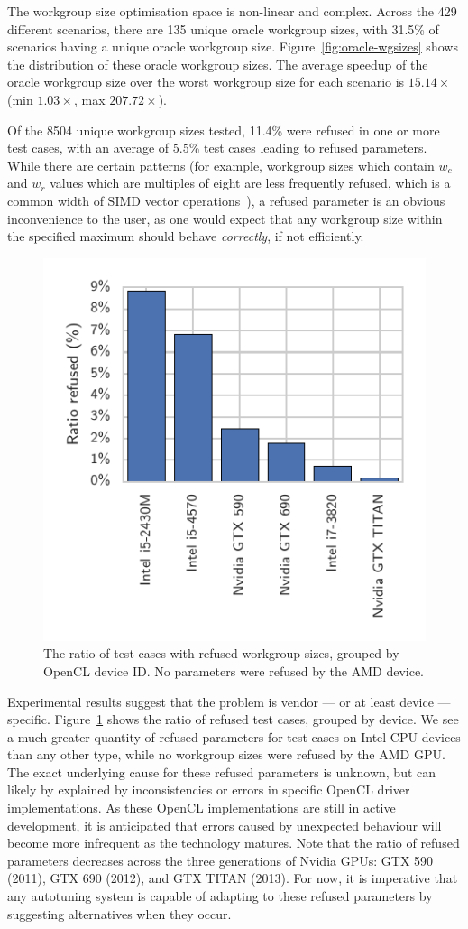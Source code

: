 \documentclass[preprint,nonatbib,10pt]{sigplanconf}
\begin{document}
The workgroup size optimisation space is non-linear and
complex. Across the 429 different scenarios, there are 135 unique
oracle workgroup sizes, with 31.5\% of scenarios having a unique
oracle workgroup size. Figure~\ref{fig:oracle-wgsizes} shows the
distribution of these oracle workgroup sizes. The average speedup of
the oracle workgroup size over the worst workgroup size for each
scenario is $15.14\times$ (min $1.03\times$, max $207.72\times$).

Of the 8504 unique workgroup sizes tested, 11.4\% were refused in one
or more test cases, with an average of 5.5\% test cases leading to
refused parameters. While there are certain patterns (for example,
workgroup sizes which contain $w_c$ and $w_r$ values which are
multiples of eight are less frequently refused, which is a common
width of SIMD vector operations~\cite{IntelCorporation2012}), a
refused parameter is an obvious inconvenience to the user, as one
would expect that any workgroup size within the specified maximum
should behave \emph{correctly}, if not efficiently.

\begin{figure}
  \centering
  \centering
  \includegraphics[width=.6\columnwidth]{img/refused_params_by_device}
  \caption{%
    The ratio of test cases with refused workgroup sizes, grouped by
    OpenCL device ID. No parameters were refused by the AMD device.%
  }
\label{fig:refused-params}
\end{figure}

Experimental results suggest that the problem is vendor --- or at
least device --- specific. Figure~\ref{fig:refused-params} shows the
ratio of refused test cases, grouped by device. We see a much greater
quantity of refused parameters for test cases on Intel CPU devices
than any other type, while no workgroup sizes were refused by the AMD
GPU. The exact underlying cause for these refused parameters is
unknown, but can likely by explained by inconsistencies or errors in
specific OpenCL driver implementations. As these OpenCL
implementations are still in active development, it is anticipated
that errors caused by unexpected behaviour will become more infrequent
as the technology matures. Note that the ratio of refused parameters
decreases across the three generations of Nvidia GPUs: GTX 590 (2011),
GTX 690 (2012), and GTX TITAN (2013). For now, it is imperative that
any autotuning system is capable of adapting to these refused
parameters by suggesting alternatives when they occur.
\end{document}
